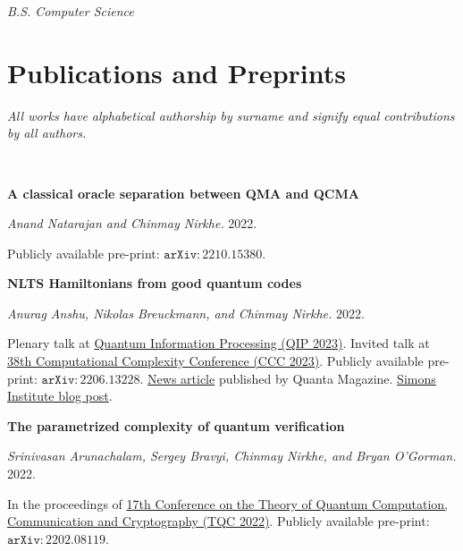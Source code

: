 \documentclass[11pt]{article}
\begin{document}
\textit{B.S. Computer Science}








\section{Publications and Preprints}
\textit{All works have alphabetical authorship by surname and signify equal contributions by all authors.}

\
\begin{enumerate}[{leftmargin=*,start=10,label=[\arabic*]\addtocounter{enumi}{-2}}]

\item \textbf{A classical oracle separation between QMA and QCMA}

\emph{Anand Natarajan and Chinmay Nirkhe.} 2022.

Publicly available pre-print: \href{https://arxiv.org/abs/2210.15380}{$\mathtt{arXiv:2210.15380}$}.

\item \textbf{NLTS Hamiltonians from good quantum codes}

\emph{Anurag Anshu, Nikolas Breuckmann, and Chinmay Nirkhe.} 2022.

Plenary talk at \href{https://indico.cern.ch/event/1175020/}{Quantum Information Processing (QIP 2023)}. Invited talk at \href{https://computationalcomplexity.org/Archive/2023/cfp.php}{38th Computational Complexity Conference (CCC 2023)}. Publicly available pre-print: \href{https://arxiv.org/abs/2206.13228}{$\mathtt{arXiv:2206.13228}$}. \href{https://www.quantamagazine.org/computer-science-proof-lifts-limits-on-quantum-entanglement-20220718/}{News article} published by Quanta Magazine. \href{https://blog.simons.berkeley.edu/2022/08/the-blind-men-and-the-quantum-elephants/}{Simons Institute blog post}.

\item \textbf{The parametrized complexity of quantum verification}

\emph{Srinivasan Arunachalam, Sergey Bravyi, Chinmay Nirkhe, and Bryan O'Gorman.} 2022.

In the proceedings of \href{https://tqc2022-conference.iquist.illinois.edu/}{17th Conference on the Theory of Quantum Computation, Communication and Cryptography (TQC 2022)}. Publicly available pre-print: \href{https://arxiv.org/abs/2202.08119}{$\mathtt{arXiv:2202.08119}$}.


\end{enumerate}
\end{document}
